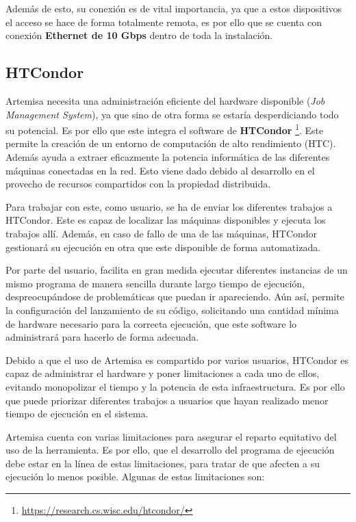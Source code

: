 Además de esto, su conexión es de vital importancia, ya que a estos dispositivos el acceso se hace de forma totalmente remota, es por ello que se cuenta con conexión \textbf{Ethernet de 10 Gbps} dentro de toda la instalación.

\subsection{HTCondor}
Artemisa necesita una administración eficiente del hardware disponible (\textit{Job Management System}), ya que sino de otra forma se estaría desperdiciando todo su potencial. Es por ello que este integra el software de \textbf{HTCondor} \footnote{\url{https://research.cs.wisc.edu/htcondor/}}. Este permite la creación de un entorno de computación de alto rendimiento (HTC). Además ayuda a extraer eficazmente la potencia informática de las diferentes máquinas conectadas en la red. Esto viene dado debido al desarrollo en el provecho de recursos compartidos con la propiedad distribuida.

Para trabajar con este, como usuario, se ha de enviar los diferentes trabajos a HTCondor. Este es capaz de localizar las máquinas disponibles y ejecuta los trabajos allí. Además, en caso de fallo de una de las máquinas, HTCondor gestionará su ejecución en otra que este disponible de forma automatizada.

Por parte del usuario, facilita en gran medida ejecutar diferentes instancias de un mismo programa de manera sencilla durante largo tiempo de ejecución, despreocupándose de problemáticas que puedan ir apareciendo. Aún así, permite la configuración del lanzamiento de su código, solicitando una cantidad mínima de hardware necesario para la correcta ejecución, que este software lo administrará para hacerlo de forma adecuada.

Debido a que el uso de Artemisa es compartido por varios usuarios, HTCondor es capaz de administrar el hardware y poner limitaciones a cada uno de ellos, evitando monopolizar el tiempo y la potencia de esta infraestructura. Es por ello que puede priorizar diferentes trabajos a usuarios que hayan realizado menor tiempo de ejecución en el sistema.

Artemisa cuenta con varias limitaciones para asegurar el reparto equitativo del uso de la herramienta. Es por ello, que el desarrollo del programa de ejecución debe estar en la línea de estas limitaciones, para tratar de que afecten a su ejecución lo menos posible. Algunas de estas limitaciones son:

